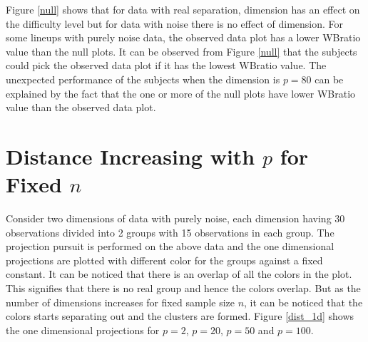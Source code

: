 Figure \ref{null} shows that for data with real separation, dimension has an effect on the difficulty level but for data with noise there is no effect of dimension. For some lineups with purely noise data, the observed data plot has a lower WBratio value than the null plots. It can be observed from Figure \ref{null} that the subjects could pick the observed data plot if it has the lowest WBratio value. The unexpected performance of the subjects when the dimension  is $p = 80$ can be explained by the fact that the one or more of the null plots have lower WBratio value than the observed data plot.


\section{Distance Increasing with $p$ for Fixed $n$} \label{sec:distance}

Consider two dimensions of data with purely noise, each dimension having 30 observations divided into 2 groups with 15 observations in each group. The projection pursuit is performed on the above data and the one dimensional projections are plotted with different color for the groups against a fixed constant. It can be noticed that there is an overlap of all the colors in the plot. This signifies that there is no real group and hence the colors overlap. But as the number of dimensions increases for fixed sample size $n$, it can be noticed that the colors starts separating out and the clusters are formed. Figure \ref{dist_1d} shows the one dimensional projections for $p=2$, $p=20$, $p=50$ and $p=100$.

